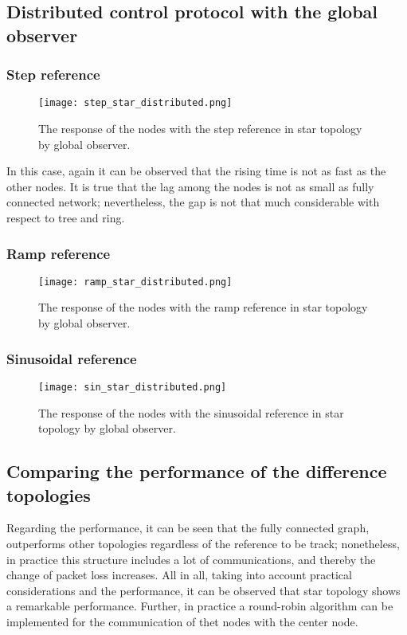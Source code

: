 \subsection{Distributed control protocol with the global observer}
\subsubsection{Step reference}
\begin{figure}[H] %
    \centering
    \texttt{[image: step\_star\_distributed.png]} %
    \caption{The response of the nodes with the step reference in star topology by global observer.}
\end{figure}
In this case, again it can be observed that the rising time is not as fast as the other nodes. It is true that  the lag among the nodes is not as small as fully connected network; nevertheless, the gap is not that much considerable with respect to tree and ring.

\subsubsection{Ramp reference}
\begin{figure}[H] %
    \centering
    \texttt{[image: ramp\_star\_distributed.png]} %
    \caption{The response of the nodes with the ramp reference in star topology by global observer.}
\end{figure}

\subsubsection{Sinusoidal reference}
\begin{figure}[H] %
    \centering
    \texttt{[image: sin\_star\_distributed.png]} %
    \caption{The response of the nodes with the sinusoidal reference in star topology by global observer.}
\end{figure}

\subsection{Comparing the performance of the difference topologies}
Regarding the performance, it can be seen that the fully connected graph, outperforms other topologies regardless of the reference to be track; nonetheless, in practice this structure includes a lot of communications, and thereby the change of packet loss increases. All in all, taking into account practical considerations and the performance, it can be observed that star topology shows a remarkable performance. Further, in practice a round-robin algorithm can be implemented for the communication of thet nodes with the center node.

